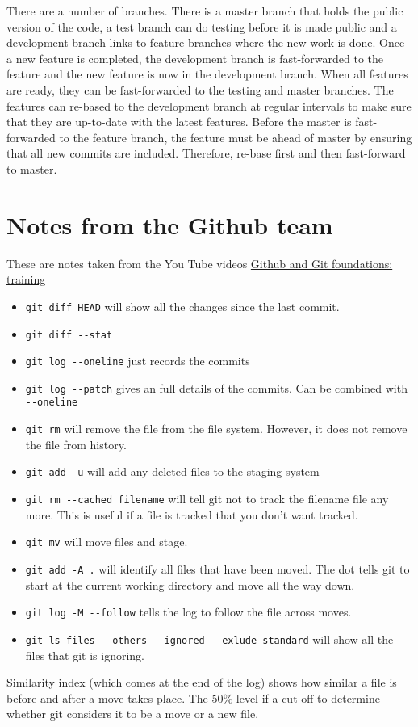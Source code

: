 \documentclass[11pt]{article} %
\begin{document}
There are a number of branches. There is a master branch that holds the public version of the code, a test branch can do testing before it is made public and a development branch links to feature branches where the new work is done.  Once a new feature is completed, the development branch is fast-forwarded to the feature and the new feature is now in the development branch.  When all features are ready, they can be fast-forwarded to the testing and master branches.  The features can re-based to the development branch at regular intervals to make sure
that they are up-to-date with the latest features. Before the master is fast-forwarded to the feature branch, the feature must be ahead of master by ensuring that all new commits are included. Therefore, re-base first and then fast-forward to master. 

\section{Notes from the Github team}
These are notes taken from the You Tube videos \href{https://www.youtube.com/watch?v=WxMFZncm12s&index=4&list=PLg7s6cbtAD15G8lNyoaYDuKZSKyJrgwB-}{Github and Git foundations: training}
\begin{itemize}
\item \lstinline{git diff HEAD} will show all the changes since the last commit. 
\item \lstinline{git diff --stat} 
\item \lstinline{git log --oneline} just records the commits
\item \lstinline{git log --patch} gives an full details of the commits. Can be combined with \lstinline{--oneline}
\item \lstinline{git rm} will remove the file from the file system.  However, it does not remove the file from history. 
\item \lstinline{git add -u} will add any deleted files to the staging system
\item \lstinline{git rm --cached filename} will tell git not to track the filename file any more.  This is useful if a file is tracked that you don't want tracked.  
\item \lstinline{git mv} will move files and stage.
\item  \lstinline{git add -A .} will identify all files that have been moved.  The dot tells git to start at the current working directory and move all the way down.
\item \lstinline{git log -M --follow} tells the log to follow the file across moves. 
\item \lstinline{git ls-files --others --ignored --exlude-standard} will show all the files that git is ignoring. 
\end{itemize}
Similarity index (which comes at the end of the log) shows how similar a file is before and after a move takes place. The 50\% level if a cut off to determine whether git considers it to be a move or a new file. 
\end{document}
